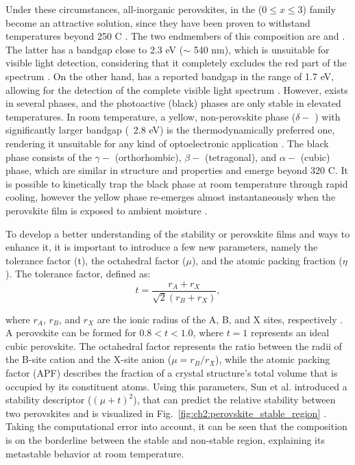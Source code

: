 Under these circumstances, all-inorganic perovskites, in the  ($0 \le x \le 3$) family become an attractive solution, since they have been proven to withstand temperatures beyond 250 \degree C \cite{Dong2021High-TemperatureCells}. The two endmembers of this composition are  and . The latter has a bandgap close to 2.3 eV ($\sim$ 540 nm), which is unsuitable for visible light detection, considering that it completely excludes the red part of the spectrum \cite{Tong2020RecentCells}. On the other hand,  has a reported bandgap in the range of 1.7 eV, allowing for the detection of the complete visible light spectrum \cite{Zhao2018ThermodynamicallyPhotovoltaics}. However,  exists in several phases, and the photoactive (black) phases are only stable in elevated temperatures. In room temperature, a yellow, non-perovskite phase ($\delta-$ ) with significantly larger bandgap (~2.8 eV) is the thermodynamically preferred one, rendering it unsuitable for any kind of optoelectronic application \cite{Cho2021Long-termNetwork, Burwig2018CrystalFilms, Steele2022AnFilms}. The black phase consists of the $\gamma-$ (orthorhombic), $\beta-$ (tetragonal), and $\alpha-$ (cubic) phase, which are similar in structure and properties and emerge beyond 320 \degree C. It is possible to kinetically trap the black phase at room temperature through rapid cooling, however the yellow phase re-emerges almost instantaneously when the perovskite film is exposed to ambient moisture \cite{Steele2019ThermalFilms}. 

To develop a better understanding of the stability or perovskite films and ways to enhance it, it is important to introduce a few new parameters, namely the tolerance factor (t), the octahedral factor ($\mu$), and the atomic packing fraction ($\eta$). The tolerance factor, defined as:
\begin{equation}
    t = \frac{r_A + r_X}{\sqrt{2}(r_B + r_X)},
    \label{eq:tolerance_factor}
\end{equation} 

where $r_A$, $r_B$, and $r_X$ are the ionic radius of the A, B, and X sites, respectively \cite{Goldschmidt1926DieKrystallochemie}. A perovskite can be formed for $0.8 < t < 1.0$, where $t = 1$ represents an ideal cubic perovskite. The octahedral factor represents the ratio between the radii of the B-site cation and the X-site anion ($\mu = r_B/r_X$), while the atomic packing factor (APF) describes the fraction of a crystal structure's total volume that is occupied by its constituent atoms. Using this parameters, Sun et al. introduced a stability descriptor ($(\mu + t)^2$), that can predict the relative stability between two perovskites and is visualized in Fig.~\ref{fig:ch2:perovskite_stable_region} \cite{Sun2017ThermodynamicPerovskites}. Taking the computational error into account, it can be seen that the  composition is on the borderline between the stable and non-stable region, explaining its metastable behavior at room temperature.  

